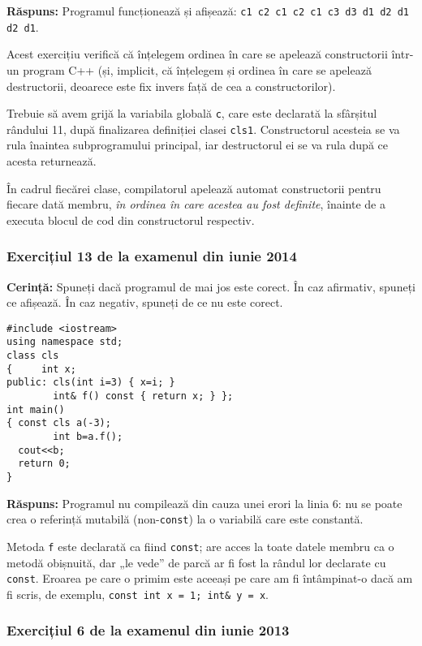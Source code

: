 \textbf{Răspuns:} Programul funcționează și afișează: \texttt{c1  c2  c1  c2  c1  c3  d3  d1  d2  d1  d2  d1}.

Acest exercițiu verifică că înțelegem ordinea în care se apelează constructorii într-un program C++ (și, implicit, că înțelegem și ordinea în care se apelează destructorii, deoarece este fix invers față de cea a constructorilor).

Trebuie să avem grijă la variabila globală \texttt{c}, care este declarată la sfârșitul rândului 11, după finalizarea definiției clasei \texttt{cls1}. Constructorul acesteia se va rula înaintea subprogramului principal, iar destructorul ei se va rula după ce acesta returnează.

În cadrul fiecărei clase, compilatorul apelează automat constructorii pentru fiecare dată membru, \emph{în ordinea în care acestea au fost definite}, înainte de a executa blocul de cod din constructorul respectiv.

\subsubsection*{Exercițiul 13 de la examenul din iunie 2014}

\textbf{Cerință:} Spuneți dacă programul de mai jos este corect. În caz afirmativ, spuneți ce afișează. În caz negativ, spuneți de ce nu este corect.
\begin{lstlisting}
#include <iostream>
using namespace std;
class cls
{     int x;
public: cls(int i=3) { x=i; }
        int& f() const { return x; } };
int main()
{ const cls a(-3);
        int b=a.f();
  cout<<b;
  return 0;
}
\end{lstlisting}

\textbf{Răspuns:} Programul nu compilează din cauza unei erori la linia 6: nu se poate crea o referință mutabilă (non-\texttt{const}) la o variabilă care este constantă.

Metoda \texttt{f} este declarată ca fiind \texttt{const}; are acces la toate datele membru ca o metodă obișnuită, dar „le vede” de parcă ar fi fost la rândul lor declarate cu \texttt{const}. Eroarea pe care o primim este aceeași pe care am fi întâmpinat-o dacă am fi scris, de exemplu, \texttt{const int x = 1; int\& y = x}.

\subsubsection*{Exercițiul 6 de la examenul din iunie 2013}

